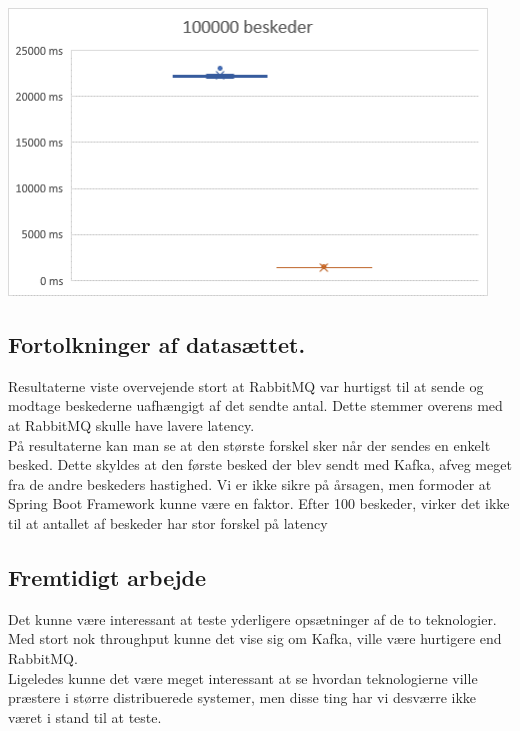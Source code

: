 \documentclass[
]{article}
\begin{document}
\includegraphics[width=5in,height=3in]{media/media/image3.png}

\hypertarget{fortolkninger-af-datasuxe6ttet.}{%
\subsection{Fortolkninger af
datasættet.}\label{fortolkninger-af-datasuxe6ttet.}}

Resultaterne viste overvejende stort at RabbitMQ var hurtigst til at
sende og modtage beskederne uafhængigt af det sendte antal. Dette
stemmer overens med at RabbitMQ skulle have lavere latency.\cite{kafka-rabbit-comparison}\\
På resultaterne kan man se at den største forskel sker når der sendes en
enkelt besked. Dette skyldes at den første besked der blev sendt med
Kafka, afveg meget fra de andre beskeders hastighed. Vi er ikke sikre på
årsagen, men formoder at Spring Boot Framework kunne være en faktor.
Efter 100 beskeder, virker det ikke til at antallet af beskeder har stor
forskel på latency

\hypertarget{fremtidigt-arbejde}{%
\subsection{Fremtidigt arbejde}\label{fremtidigt-arbejde}}

Det kunne være interessant at teste yderligere opsætninger af de to
teknologier.\\
Med stort nok throughput kunne det vise sig om Kafka, ville være
hurtigere end RabbitMQ.\\
Ligeledes kunne det være meget interessant at se hvordan teknologierne
ville præstere i større distribuerede systemer, men disse ting har vi
desværre ikke været i stand til at teste.
\end{document}
